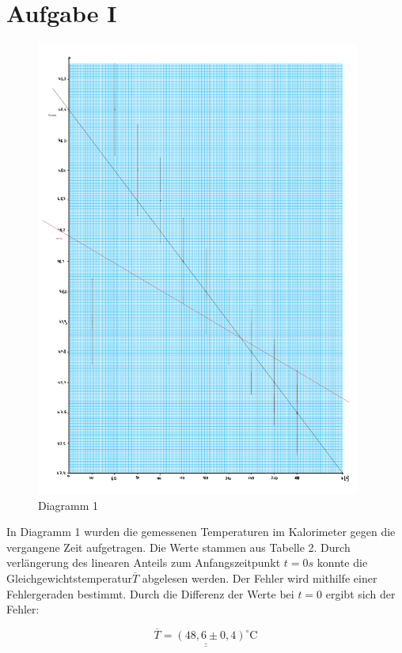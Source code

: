 \section{Aufgabe I}

\begin{figure}[h!]
    \centering
    \includegraphics[page=1, width=0.95\textwidth,]{Verusch42Dia.pdf}
    \caption{Diagramm 1}
\end{figure}
\newpage

In Diagramm 1 wurden die gemessenen Temperaturen im Kalorimeter gegen die vergangene Zeit aufgetragen. Die Werte
stammen aus Tabelle 2. Durch verlängerung des linearen Anteils zum Anfangszeitpunkt $t = 0s$ konnte die Gleichgewichtstemperatur$\overline{T}$ abgelesen werden.
Der Fehler wird mithilfe einer Fehlergeraden bestimmt. Durch die Differenz der Werte bei $t=0$ ergibt sich der Fehler:

\[ \underline{\underline{\overline{T} = (48,6 \pm 0,4)^\circ \text{C}}}\]


